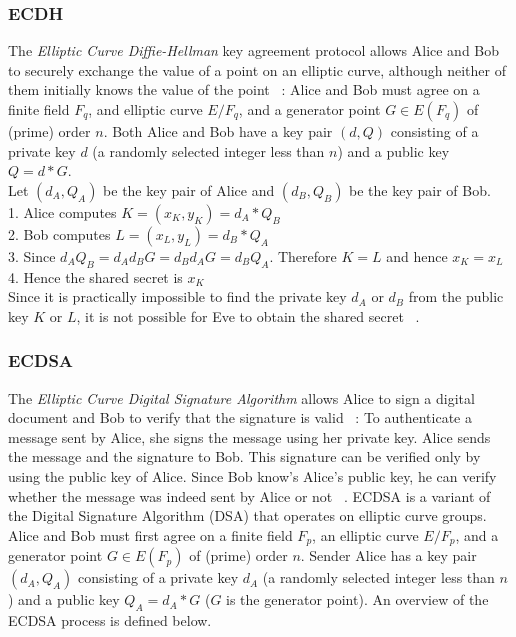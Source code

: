\documentclass[11pt]{article}
\begin{document}
\subsubsection{ECDH} \label{ECDH}
The \emph{Elliptic Curve Diffie-Hellman} key agreement protocol allows Alice and Bob 
to securely exchange the value of a point on an elliptic curve, 
although neither of them initially knows the value of the point ~\cite{anoop2007elliptic,silverman2009arithmetic}: 
Alice and Bob must agree on a finite field $F_q$, and elliptic curve $E/F_q$, and a generator point $G \in E(F_q)$  of (prime) order $n$.
Both Alice and Bob have a key pair $(d,Q)$ consisting of a private key $d$ (a randomly selected integer less than $n$) 
and a public key $Q = d * G$.\\
Let $(d_A,Q_A)$ be the key pair of Alice and $(d_B,Q_B)$ be the key pair of Bob.\\
1. Alice computes $K = (x_K,y_K) = d_A * Q_B$\\
2. Bob computes $L = (x_L,y_L) = d_B * Q_A$\\
3. Since $d_AQ_B = d_Ad_BG = d_Bd_AG = d_BQ_A$. Therefore $K = L$ and hence $x_K = x_L$\\
4. Hence the shared secret is $x_K$\\
Since it is practically impossible to find the private key $d_A$ or $d_B$ from the public key $K$ or $L$, it is not possible for Eve to obtain the shared secret ~\cite{anoop2007elliptic,silverman2009arithmetic,jurivsic1997elliptic}.

\subsubsection{ECDSA} \label{ECDSA}
The \emph{Elliptic Curve Digital Signature Algorithm} allows Alice to sign a digital document and Bob to verify that the signature is valid ~\cite{silverman2009arithmetic}:
To authenticate a message sent by Alice, she signs the message using her private key. 
Alice sends the message and the signature to Bob. 
This signature can be verified only by using the public key of Alice. 
Since Bob know's Alice's public key, he can verify whether the message was indeed sent by Alice or not ~\cite{anoop2007elliptic}.
ECDSA is a variant of the Digital Signature Algorithm (DSA) that operates on elliptic curve groups. 
\\
Alice and Bob must first agree on a finite field $F_p$, an elliptic curve $E/F_p$, and a generator point $G \in E(F_p)$ of (prime) order $n$.
Sender Alice has a key pair $(d_A,Q_A)$ consisting of a private key $d_A$ (a randomly selected integer less than $n$) 
and a public key $Q_A = d_A * G$ ($G$ is the generator point). 
An overview of the ECDSA process is defined below. 
\end{document}
